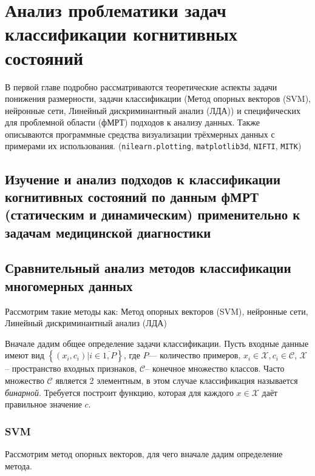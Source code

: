 \chapter{Анализ проблематики задач классификации когнитивных состояний}
\label{chapter1}
\begin{annotation}
	В первой главе подробно рассматриваются теоретические аспекты задачи понижения размерности, задачи классификации (Метод опорных векторов (SVM), нейронные сети, Линейный дискриминантный анализ (ЛДА)) и специфических для проблемной области (фМРТ) подходов к анализу данных. Также описываются программные средства визуализации трёхмерных данных с примерами их использования. (\verb|nilearn.plotting|\cite{10.3389/fninf.2014.00014}, \verb|matplotlib3d|\cite{Hunter:2007}, \verb|NIFTI|, \verb|MITK|\cite{wolf2004medical})
\end{annotation}

\section{Изучение и анализ подходов к классификации когнитивных состояний по данным фМРТ (статическим и динамическим) применительно к задачам медицинской диагностики}



\section{Сравнительный анализ методов классификации многомерных данных }
\begin{annotation}
	Рассмотрим такие методы как: Метод опорных векторов (SVM), нейронные сети, Линейный дискриминантный анализ (ЛДА)
\end{annotation}

Вначале дадим общее определение задачи классификации.
Пусть входные данные имеют вид $\left\{(x_i,c_i)| i \in \overline{1,P}\right\}$, где $P$--- количество примеров, $x_i \in \mathcal X, c_i \in \mathcal C$, $\mathcal X$-- пространство входных признаков, $\mathcal C$-- конечное множество классов. Часто множество $\mathcal C$ является 2 элементным, в этом случае классификация называется \textit{бинарной}. Требуется построит функцию, которая для каждого $x \in \mathcal X$  даёт правильное значение $c$. 
\subsection{SVM}

Рассмотрим метод опорных векторов, для чего вначале дадим определение метода.

